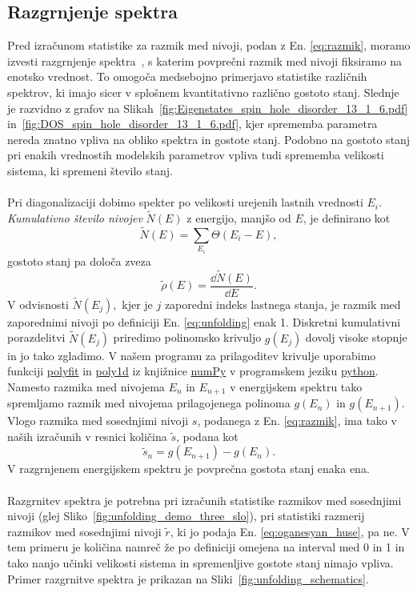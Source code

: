 \subsection{Razgrnjenje spektra}
\label{razgrnjenje}
Pred izračunom statistike za razmik med nivoji, podan z En. \eqref{eq:razmik}, moramo izvesti razgrnjenje spektra~\cite{abul2014unfolding}, s katerim povprečni razmik med nivoji fiksiramo na enotsko vrednost. To omogoča medsebojno primerjavo statistike različnih spektrov, ki imajo sicer v splošnem kvantitativno različno gostoto stanj. Slednje je razvidno z grafov na Slikah~\ref{fig:Eigenstates_spin_hole_disorder_13_1_6.pdf} in~\ref{fig:DOS_spin_hole_disorder_13_1_6.pdf}, kjer sprememba parametra nereda znatno vpliva na obliko spektra in gostote stanj. Podobno na gostoto stanj pri enakih vrednostih modelskih parametrov vpliva tudi sprememba velikosti sistema, ki spremeni število stanj. \\\\
Pri diagonalizaciji dobimo spekter po velikosti urejenih lastnih vrednosti $E_i$. \emph{Kumulativno število nivojev} $\tilde{N}(E)$ z energijo, manjšo od $E$, je definirano kot
\begin{equation}\label{eq:unfolding}
\tilde{N}(E)=\sum\limits_{E_i}\Theta(E_i-E),
\end{equation}
gostoto stanj pa določa zveza 
\begin{equation}\label{eq:DOS}
\tilde{\rho}(E)=\frac{\dd \tilde{N}(E)}{\dd E}.
\end{equation}
V odvisnosti $\tilde{N}(E_j),$ kjer je $j$ zaporedni indeks lastnega stanja, je razmik med zaporednimi nivoji po definiciji En. \eqref{eq:unfolding} enak 1. Diskretni kumulativni porazdelitvi $\tilde{N}(E_j)$ priredimo polinomsko krivuljo $g(E_j)$ dovolj visoke stopnje in jo tako zgladimo. V našem programu za prilagoditev krivulje uporabimo funkciji \url{polyfit} in \url{poly1d} iz knjižnice \url{numPy} v programskem jeziku \url{python}.
 Namesto razmika med nivojema $E_n$ in $E_{n+1}$ v energijskem spektru tako spremljamo razmik med nivojema prilagojenega polinoma $g(E_{n})$ in $g(E_{n+1})$. Vlogo razmika med sosednjimi nivoji $s$, podanega z En. \eqref{eq:razmik}, ima tako v naših izračunih v resnici količina $\tilde{s}$, podana kot
$$
\tilde{s}_n=g(E_{n+1})-g(E_n).
$$
V razgrnjenem energijskem spektru je povprečna gostota stanj enaka ena. \\\\
Razgrnitev spektra je potrebna pri izračunih statistike razmikov med sosednjimi nivoji (glej Sliko~\ref{fig:unfolding_demo_three_slo}), pri statistiki razmerij razmikov med sosednjimi nivoji $\tilde{r}$, ki jo podaja En. \eqref{eq:oganesyan_huse}, pa ne. V tem primeru je količina namreč že po definiciji omejena na interval med 0 in 1 in tako nanjo učinki velikosti sistema in spremenljive gostote stanj nimajo vpliva. Primer razgrnitve spektra je prikazan na Sliki~\ref{fig:unfolding_schematics}.
